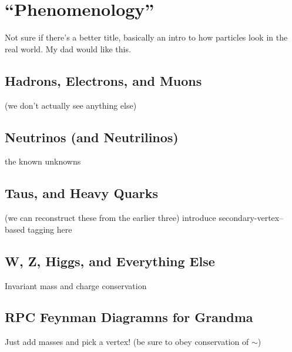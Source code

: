 \section{``Phenomenology''}
\label{sec:pheno}
Not sure if there's a better title, basically an intro to how particles
look in the real world. My dad would like this.
\subsection{Hadrons, Electrons, and Muons}
(we don't actually see anything else)
\subsection{Neutrinos (and Neutrilinos)}
the known unknowns
\subsection{Taus, and Heavy Quarks}
(we can reconstruct these from the earlier three)
introduce secondary-vertex--based tagging here
\subsection{W, Z, Higgs, and Everything Else}
Invariant mass and charge conservation
\subsection{RPC Feynman Diagramns for Grandma}
Just add masses and pick a vertex! (be sure to obey conservation of $\sim$)
